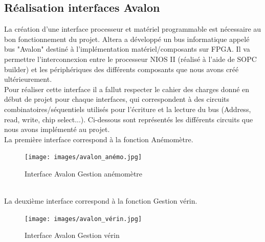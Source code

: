   \newpage

  \subsection{Réalisation interfaces Avalon}

La création d'une interface processeur et matériel programmable est nécessaire au bon fonctionnement du projet. Altera a développé un bus informatique appelé bus "Avalon" destiné à l'implémentation matériel/composants sur FPGA. Il va permettre l'interconnexion entre le processeur NIOS II (réalisé à l'aide de SOPC builder) et les périphériques des différents composants que nous avons créé ultérieurement.\\
\newline
Pour réaliser cette interface il a fallut respecter le cahier des charges donné en début de projet pour chaque interfaces, qui correspondent à des circuits combinatoires/séquentiels utilisés pour l'écriture et la lecture du bus (Address, read, write, chip select...). Ci-dessous sont représentés les différents circuits que nous avons implémenté au projet.\\
\newline
La première interface correspond à la fonction Anémomètre.
\begin{figure}[h]
  \begin{center}
    \texttt{[image: images/avalon\_anémo.jpg]}
    \caption{Interface Avalon Gestion anémomètre}
  \end{center}
\end{figure}\\
\newline
La deuxième interface correspond à la fonction Gestion vérin.

\begin{figure}[h]
  \begin{center}
    \texttt{[image: images/avalon\_vérin.jpg]}
    \caption{Interface Avalon Gestion vérin}
  \end{center}
\end{figure}